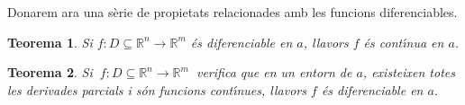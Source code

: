 \documentclass[12pt]{article}
\newcommand{\observacio}{\textbf{Observaci{\'o}}\ \ }
\newcommand{\solucio}{\textbf{Soluci{\'o}}\ \ }
\newtheorem{teorema}{Teorema}[subsection]
\newtheorem{exemple}{Exemple}[subsection]
\newcommand{\R}{\mathbb{R}}
\begin{document}
%
%
%

\vspace{0.4cm}
Donarem ara una s{\`e}rie de propietats relacionades amb les funcions diferenciables.

\vspace{0.4cm}
\begin{teorema}
Si $f:D \subseteq\R^n \longrightarrow \R^m$ {\'e}s diferenciable en
$a$, llavors $f$ {\'e}s cont{\'\i}nua en $a$.
\end{teorema}


%
%



\vspace{0.4cm}
\begin{teorema}
Si $\ f:D \subseteq\R^n \longrightarrow \R^m\ $ verifica que en un entorn de $a$, existeixen totes les derivades parcials i s{\'o}n funcions cont{\'\i}nues,  llavors $f$  {\'e}s diferenciable en $a$.
\end{teorema}
\end{document}
